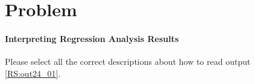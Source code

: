 \documentclass{ltjbook}
\begin{document}
\section{Problem}
\paragraph{Interpreting Regression Analysis Results} Please select all the correct descriptions about how to read output \ref{RS:out24_01}.

\end{document}
